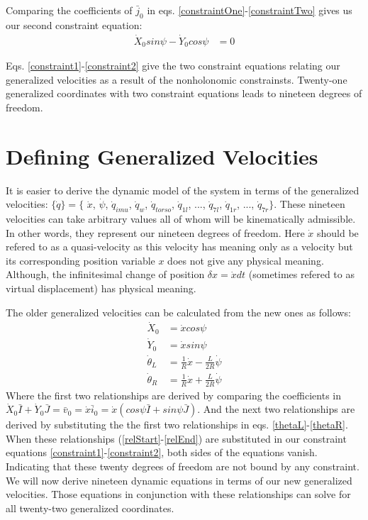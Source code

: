 \documentclass[a4paper,10pt]{article}
\begin{document}
Comparing the coefficients of $\bar{j}_0$ in eqs. \ref{constraintOne}-\ref{constraintTwo} gives us our second constraint equation:
\begin{align}
 \dot{X}_0 sin\psi - \dot{Y}_0 cos\psi &= 0 \label{constraint2}
\end{align}

Eqs. \ref{constraint1}-\ref{constraint2} give the two constraint equations relating our generalized velocities as a 
result of the nonholonomic constrainsts. Twenty-one generalized coordinates with two constraint equations leads
to nineteen degrees of freedom.

\section{Defining Generalized Velocities}
It is easier to derive the dynamic model of the system in terms of the generalized velocities:
$\{\dot{q}\} = \{$ $\dot{x}$, $\dot{\psi}$, $\dot{q}_{imu}$, $\dot{q}_{w}$, $\dot{q}_{torso}$, $\dot{q}_{1l}$, $...$, $\dot{q}_{7l}$, $\dot{q}_{1r}$, $...$, $\dot{q}_{7r} \}$. 
These nineteen velocities can take
arbitrary values all of whom will be kinematically admissible. In other words, they represent
our nineteen degrees of freedom. Here $\dot{x}$ should be refered
to as a quasi-velocity as this velocity has meaning only as a velocity but its corresponding
position variable $x$ does not give any physical meaning. Although, the infinitesimal change of
position $\delta x = \dot{x} dt$ (sometimes refered to as virtual displacement) has physical
meaning.

The older generalized velocities can be calculated from the new ones as follows:
\begin{align}
 \dot{X}_0 &= \dot{x}cos\psi \label{relStart}\\
 \dot{Y}_0 &= \dot{x}sin\psi \\
 \dot\theta_L &= \frac{1}{R}\dot{x} - \frac{L}{2R}\dot{\psi} \\
 \dot\theta_R &= \frac{1}{R}\dot{x} + \frac{L}{2R}\dot{\psi} \label{relEnd}
\end{align}
Where the first two relationships are derived by comparing the coefficients in 
$\dot{X}_0\bar{I}+\dot{Y}_0\bar{J} = \bar{v}_0 = \dot{x}\bar{i}_0 = \dot{x}(cos\psi\bar{I}+sin\psi\bar{J})$.
And the next
two relationships are derived by substituting the the first two relationships in eqs. \ref{thetaL}-\ref{thetaR}.
When these relationships (\ref{relStart}-\ref{relEnd}) are substituted in our constraint equations \ref{constraint1}-\ref{constraint2}, both
sides of the equations vanish. Indicating that these twenty degrees of freedom are not bound by any constraint.
We will now derive nineteen dynamic equations in terms of our new generalized velocities. Those equations in
conjunction with these relationships can solve for all twenty-two generalized coordinates.
\end{document}
